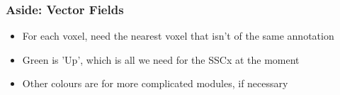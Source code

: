 \documentclass{beamer}
\begin{document}
\begin{frame}
  \frametitle{Aside: Vector Fields}
  \begin{itemize}
     \item For each voxel, need the nearest voxel that isn't of the same annotation
     \item Green is 'Up', which is all we need for the SSCx at the moment
     \item Other colours are for more complicated modules, if necessary
  \end{itemize}
\end{frame}
\end{document}
